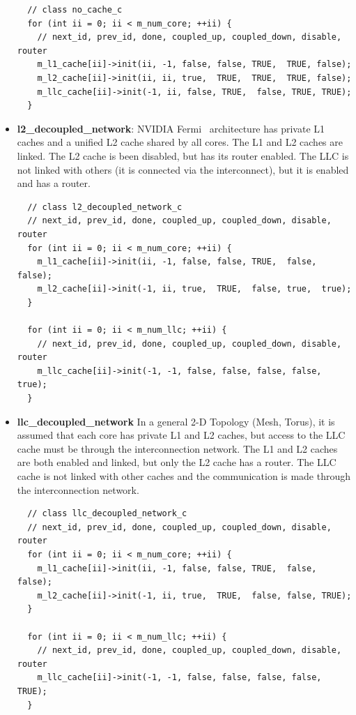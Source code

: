\begin{itemize}
  \begin{Verbatim}
  // class no_cache_c
  for (int ii = 0; ii < m_num_core; ++ii) {
    // next_id, prev_id, done, coupled_up, coupled_down, disable, router
    m_l1_cache[ii]->init(ii, -1, false, false, TRUE,  TRUE, false);
    m_l2_cache[ii]->init(ii, ii, true,  TRUE,  TRUE,  TRUE, false);
    m_llc_cache[ii]->init(-1, ii, false, TRUE,  false, TRUE, TRUE);
  }
  \end{Verbatim}

  \item \textbf{l2\_decoupled\_network}: NVIDIA Fermi~\cite{fermi} architecture has private L1 caches and a
  unified L2 cache shared by all cores. The L1 and L2 caches are linked. The L2
  cache is been disabled, but has its router enabled. The LLC is not linked with
  others (it is connected via the interconnect), but it is enabled and has a
  router.

  \begin{Verbatim}
  // class l2_decoupled_network_c
  // next_id, prev_id, done, coupled_up, coupled_down, disable, router
  for (int ii = 0; ii < m_num_core; ++ii) {
    m_l1_cache[ii]->init(ii, -1, false, false, TRUE,  false, false);
    m_l2_cache[ii]->init(-1, ii, true,  TRUE,  false, true,  true);
  }

  for (int ii = 0; ii < m_num_llc; ++ii) {
    // next_id, prev_id, done, coupled_up, coupled_down, disable, router
    m_llc_cache[ii]->init(-1, -1, false, false, false, false, true);
  }
  \end{Verbatim}
  
  \item \textbf{llc\_decoupled\_network} In a general 2-D Topology (Mesh, Torus), 
  it is assumed that each core has private L1 and L2 caches, but access to 
  the LLC cache must be through the interconnection network. The L1 and L2 caches 
  are both enabled and linked, but only the L2 cache has a router. The LLC cache is not linked
  with other caches and the communication is made through the interconnection
  network.

  \begin{Verbatim}
  // class llc_decoupled_network_c
  // next_id, prev_id, done, coupled_up, coupled_down, disable, router
  for (int ii = 0; ii < m_num_core; ++ii) {
    m_l1_cache[ii]->init(ii, -1, false, false, TRUE,  false, false);
    m_l2_cache[ii]->init(-1, ii, true,  TRUE,  false, false, TRUE);
  }

  for (int ii = 0; ii < m_num_llc; ++ii) {
    // next_id, prev_id, done, coupled_up, coupled_down, disable, router
    m_llc_cache[ii]->init(-1, -1, false, false, false, false, TRUE);
  }
  \end{Verbatim}
\end{itemize}


